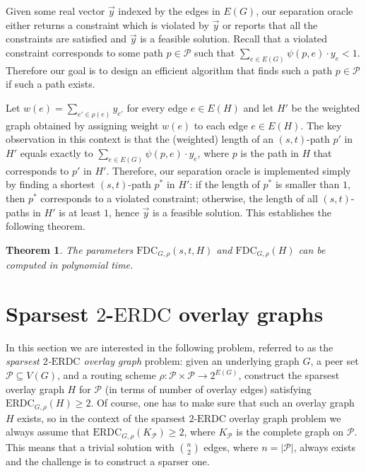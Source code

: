 \LongVersion \documentclass[11pt]{article}
\newtheorem{theorem}{Theorem}[section]
\theoremstyle{definition}
\theoremstyle{plain}
\newcommand{\Vertices}[0]{\mathit{V}}
\newcommand{\Edges}[0]{\mathit{E}}
\newcommand{\Peers}[0]{\mathcal{P}}
\newcommand{\ERDC}[0]{\mathrm{ERDC}}
\newcommand{\FDC}[0]{\mathrm{FDC}}
\begin{document}
Given some real vector $\vec{y}$ indexed by the edges in $\Edges(G)$, our
separation oracle either returns a constraint which is violated by $\vec{y}$
or reports that all the constraints are satisfied and $\vec{y}$ is a feasible
solution.
Recall that a violated constraint corresponds to some path $p \in \mathcal{P}$
such that $\sum_{e \in \Edges(G)} \psi(p, e) \cdot y_{e} < 1$.
Therefore our goal is to design an efficient algorithm that finds such
a path $p \in \mathcal{P}$ if such a path exists.

Let $w(e) = \sum_{e' \in \rho(e)} y_{e'}$ for every edge $e \in \Edges(H)$ and
let $H'$ be the weighted graph obtained by assigning weight $w(e)$ to each
edge $e \in \Edges(H)$.
The key observation in this context is that the (weighted) length of an
$(s, t)$-path $p'$ in $H'$ equals exactly to $\sum_{e \in \Edges(G)} \psi(p,
e) \cdot y_{e}$, where $p$ is the path in $H$ that corresponds to $p'$ in
$H'$.
Therefore, our separation oracle is implemented simply by finding a shortest
$(s, t)$-path $p^{*}$ in $H'$:
if the length of $p^{*}$ is smaller than $1$, then $p^{*}$ corresponds to a
violated constraint;
otherwise, the length of all $(s, t)$-paths in $H'$ is at least $1$, hence
$\vec{y}$ is a feasible solution.
This establishes the following theorem.

\begin{theorem} \label{theorem:EfficientFDC}
The parameters $\FDC_{G, \rho}(s, t, H)$ and $\FDC_{G, \rho}(H)$ can be
computed in polynomial time.
\end{theorem}

\section{Sparsest $2$-$\ERDC$ overlay graphs}
\label{section:SparseOverlayGraphs}


In this section we are interested in the following problem, referred to as the
\emph{sparsest $2$-$\ERDC$ overlay graph} problem:
given an underlying graph $G$, a peer set $\Peers \subseteq \Vertices(G)$, and
a routing scheme $\rho : \Peers \times \Peers \rightarrow 2^{\Edges(G)}$,
construct the sparsest overlay graph $H$ for $\Peers$
(in terms of number of overlay edges) satisfying $\ERDC_{G, \rho}(H) \geq 2$.
Of course, one has to make sure that such an overlay graph $H$ exists, so in
the context of the sparsest $2$-$\ERDC$ overlay graph problem we always assume
that $\ERDC_{G, \rho}(K_{\Peers}) \geq 2$, where $K_{\Peers}$ is the complete graph
on $\Peers$.
This means that a trivial solution with ${n}\choose{2}$ edges, where $n =
|\Peers|$, always exists and the challenge is to construct a sparser one.
\end{document}
